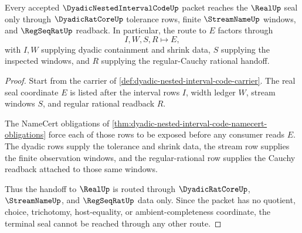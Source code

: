 \begin{theorem}
\label{thm:dyadic-nested-interval-code-regular-cauchy-handoff}
Every accepted $\DyadicNestedIntervalCodeUp$ packet reaches the $\RealUp$ seal only through $\DyadicRatCoreUp$ tolerance rows, finite $\StreamNameUp$ windows, and $\RegSeqRatUp$ readback. In particular, the route to $E$ factors through
$$
I,W,S,R \longmapsto E,
$$
with $I,W$ supplying dyadic containment and shrink data, $S$ supplying the inspected windows, and $R$ supplying the regular-Cauchy rational handoff.
\end{theorem}
\begin{proof}
Start from the carrier of \autoref{def:dyadic-nested-interval-code-carrier}. The real seal coordinate $E$ is listed after the interval rows $I$, width ledger $W$, stream windows $S$, and regular rational readback $R$.

The NameCert obligations of \autoref{thm:dyadic-nested-interval-code-namecert-obligations} force each of those rows to be exposed before any consumer reads $E$. The dyadic rows supply the tolerance and shrink data, the stream row supplies the finite observation windows, and the regular-rational row supplies the Cauchy readback attached to those same windows.

Thus the handoff to $\RealUp$ is routed through $\DyadicRatCoreUp$, $\StreamNameUp$, and $\RegSeqRatUp$ data only. Since the packet has no quotient, choice, trichotomy, host-equality, or ambient-completeness coordinate, the terminal seal cannot be reached through any other route.
\end{proof}


\begin{closurestatus}{\DyadicNestedIntervalCodeUp}
  \theoryclosure{\seedClosure}
  \formalstatus{\unformalizedV}
\end{closurestatus}

